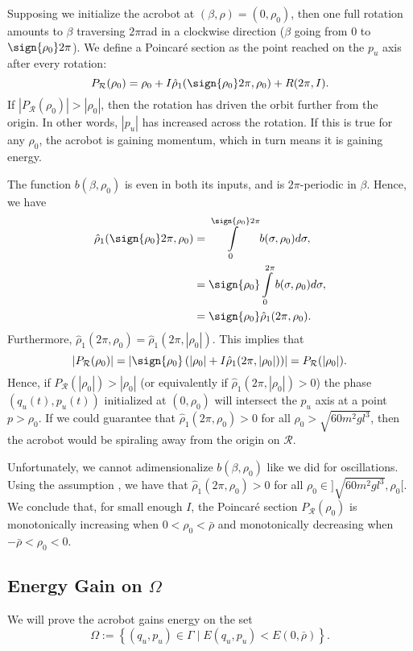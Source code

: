 Supposing we initialize the acrobot at \((\beta,\rho) = (0,\rho_0)\),
then one full rotation amounts to \(\beta\) traversing \(2\pi\)rad in a clockwise
direction (\ie \(\beta\) going from \(0\) to \(\sign{\rho_0}2\pi\)).
We define a Poincar\'{e} section as the point reached on the \(p_u\) axis after
every rotation:
\[
    P_\mathcal{R}(\rho_0) = \rho_0 + I \hat{\rho}_1(\sign{\rho_0}2\pi, \rho_0)
      + R(2\pi,I)
    .
\]
If \(|P_\mathcal{R}(\rho_0)| > |\rho_0|\), then the rotation has
driven the orbit further from the origin.
In other words, \(|p_u|\) has increased across the rotation.
If this is true for any \(\rho_0\), the acrobot is gaining momentum, which in
turn means it is gaining energy.

The function \(b(\beta,\rho_0)\) is even in both its inputs, and is 
\(2\pi\)-periodic in \(\beta\).
Hence, we have 
\begin{align*}
    \hat{\rho}_1(\sign{\rho_0}2\pi, \rho_0) &=
    \int \limits_0^{\sign{\rho_0}2\pi} b(\sigma,\rho_0)d\sigma
    , \\
     &=\sign{\rho_0}\int\limits_0^{2\pi}b(\sigma,\rho_0)d\sigma
     , \\
     &= \sign{\rho_0} \hat{\rho}_1(2\pi,\rho_0)
     .
\end{align*}
Furthermore, \(\hat{\rho}_1(2\pi,\rho_0) = \hat{\rho}_1(2\pi,|\rho_0|)\).
This implies that
\[
    |P_\mathcal{R}(\rho_0)| = \left|\sign{\rho_0}\left(
        |\rho_0| + I \hat{\rho}_1(2\pi,|\rho_0|)\right)
    \right|
    = P_\mathcal{R}(|\rho_0|)
    .
\]
Hence, if \(P_\mathcal{R}(|\rho_0|) > |\rho_0|\) (or equivalently if
\(\hat{\rho}_1(2\pi,|\rho_0|) > 0\))
the phase \((q_u(t),p_u(t))\) initialized at \((0,\rho_0)\) 
will intersect the \(p_u\) axis at a point \(p > \rho_0\).
If we could guarantee that \(\hat{\rho}_1(2\pi,\rho_0) > 0\)
for all \(\rho_0 > \sqrt{60m^2gl^3}\), then the acrobot would be spiraling away
from the origin on \(\mathcal{R}\).

Unfortunately, we cannot adimensionalize
\(b(\beta,\rho_0)\) like we did for oscillations. 
Using the assumption , we have that 
\(\hat{\rho}_1(2\pi,\rho_0) > 0 \) for all 
\(\rho_0 \in ]\sqrt{60m^2gl^3},\rho_0[\).
We conclude that, for small enough \(I\), the Poincar\'{e} section 
\(P_\mathcal{R}(\rho_0)\) is monotonically increasing when 
\(0 < \rho_0 < \bar{\rho}\) and
monotonically decreasing when \(-\bar{\rho} < \rho_0 < 0\).  

\subsection*{Energy Gain on \(\Omega\)}
We will prove the acrobot gains energy on the set 
\[
    \Omega := \left\{ (q_u,p_u) \in \Gamma 
     \mid E(q_u,p_u) < E(0,\bar{\rho}) \right\}
    .
\]

